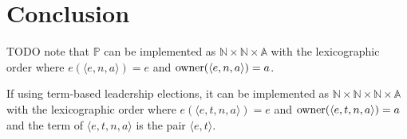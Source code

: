 \documentclass[journal]{IEEEtran}
\begin{document}
%






\section{Conclusion}

TODO note that $\mathbb P$ can be implemented as $\mathbb N \times \mathbb N
\times \mathbb A$ with the lexicographic order where $e(\langle e, n, a
\rangle) = e$ and $\mathrm{owner}(\langle e, n, a\rangle) = a$.

If using term-based leadership elections, it can be implemented as $\mathbb N
\times \mathbb N \times \mathbb N \times \mathbb A$ with the lexicographic
order where $e(\langle e, t, n, a \rangle) = e$ and $\mathrm{owner}(\langle e, t, n,
a\rangle) = a$ and the term of $\langle e, t, n, a \rangle$ is the pair
$\langle e, t \rangle$.
\end{document}
